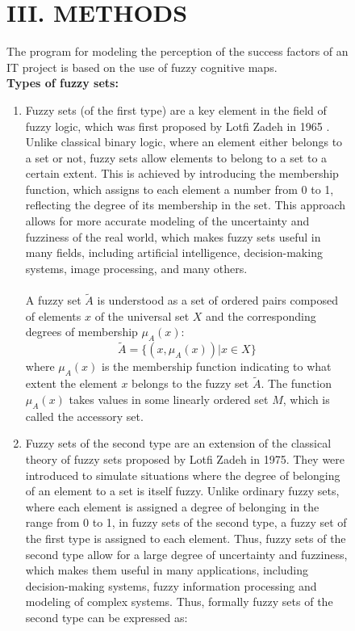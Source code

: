 \documentclass{article}
\begin{document}
\begin{figure}[!t]
\begin{minipage}{0.49\textwidth}
\begin{center}
                \chapter{III. METHODS}
            \end{center}
            The program for modeling the perception of the success factors of an IT project is based on the use of fuzzy cognitive maps.\\
            \textbf{Types of fuzzy sets:}
            \begin{enumerate}
                \item Fuzzy sets (of the first type) are a key element in the field of fuzzy logic, which was first proposed by Lotfi Zadeh in 1965 \cite{litlink21}. Unlike classical binary logic, where an element either belongs to a set or not, fuzzy sets allow elements to belong to a set to a certain extent. This is achieved by introducing the membership function, which assigns to each element a number from 0 to 1, reflecting the degree of its membership in the set. This approach allows for more accurate modeling of the uncertainty and fuzziness of the real world, which makes fuzzy sets useful in many fields, including artificial intelligence, decision-making systems, image processing, and many others.\\
                ~\\
                A fuzzy set $\tilde{A}$ is understood as a set of ordered pairs composed of elements $x$ of the universal set $X$ and the corresponding degrees of membership $\mu_A(x)$:\\
                $$\tilde{A}=\{(x, \mu_A(x)) | x \in X\}$$
                where $\mu_A(x)$ is the membership function indicating to what extent the element $x$ belongs to the fuzzy set $\tilde{A}$. The function $\mu_A(x)$ takes values in some linearly ordered set $M$, which is called the accessory set.
                \item Fuzzy sets of the second type are an extension of the classical theory of fuzzy sets proposed by Lotfi Zadeh in 1975. They were introduced to simulate situations where the degree of belonging of an element to a set is itself fuzzy. Unlike ordinary fuzzy sets, where each element is assigned a degree of belonging in the range from 0 to 1, in fuzzy sets of the second type, a fuzzy set of the first type is assigned to each element. Thus, fuzzy sets of the second type allow for a large degree of uncertainty and fuzziness, which makes them useful in many applications, including decision-making systems, fuzzy information processing and modeling of complex systems. Thus, formally fuzzy sets of the second type can be expressed as:

\end{enumerate}
\end{minipage}
\end{figure}
\end{document}
